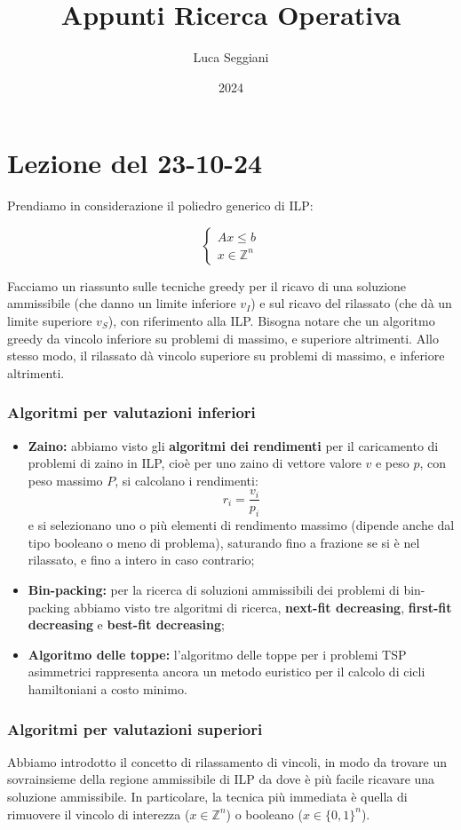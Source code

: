 \documentclass[a4paper,11pt]{article}
\title{Appunti Ricerca Operativa}
\author{Luca Seggiani}
\date{2024}
\begin{document}
\section{Lezione del 23-10-24}

\thispagestyle{empty}
\pagestyle{fancy}

Prendiamo in considerazione il poliedro generico di ILP:

\[
	\begin{cases}
		Ax \leq b \\ 
		x \in \mathbb{Z}^n
	\end{cases}
\]

Facciamo un riassunto sulle tecniche greedy per il ricavo di una soluzione ammissibile (che danno un limite inferiore $v_I$) e sul ricavo del rilassato (che dà un limite superiore $v_S$), con riferimento alla ILP.
Bisogna notare che un algoritmo greedy da vincolo inferiore su problemi di massimo, e superiore altrimenti.
Allo stesso modo, il rilassato dà vincolo superiore su problemi di massimo, e inferiore altrimenti.

\subsubsection{Algoritmi per valutazioni inferiori}
\begin{itemize}
	\item \textbf{Zaino:} abbiamo visto gli \textbf{algoritmi dei rendimenti} per il caricamento di problemi di zaino in ILP, cioè per uno zaino di vettore valore $v$ e peso $p$, con peso massimo $P$, si calcolano i rendimenti:
		$$
		r_i = \frac{v_i}{p_i}
		$$
		e si selezionano uno o più elementi di rendimento massimo (dipende anche dal tipo booleano o meno di problema), saturando fino a frazione se si è nel rilassato, e fino a intero in caso contrario;
	\item \textbf{Bin-packing:} per la ricerca di soluzioni ammissibili dei problemi di bin-packing abbiamo visto tre algoritmi di ricerca, \textbf{next-fit decreasing}, \textbf{first-fit decreasing} e \textbf{best-fit decreasing};
	\item \textbf{Algoritmo delle toppe:} l'algoritmo delle toppe per i problemi TSP asimmetrici rappresenta ancora un metodo euristico per il calcolo di cicli hamiltoniani a costo minimo. 
\end{itemize}

\subsubsection{Algoritmi per valutazioni superiori}
Abbiamo introdotto il concetto di rilassamento di vincoli, in modo da trovare un sovrainsieme della regione ammissibile di ILP da dove è più facile ricavare una soluzione ammissibile.
In particolare, la tecnica più immediata è quella di rimuovere il vincolo di interezza ($x \in \mathbb{Z}^n$) o booleano ($x \in \{0, 1\}^n$).
\end{document}

